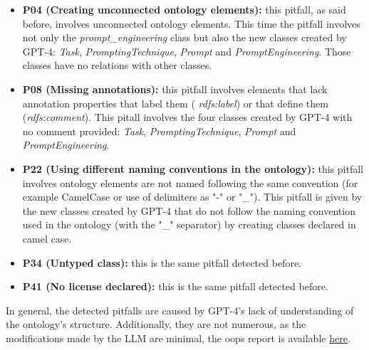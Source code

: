 \begin{itemize}
    \item \textbf{P04 (Creating unconnected ontology elements):} this pitfall, as said before, involves unconnected ontology elements. This time the pitfall involves not only the \textit{prompt\_engineering} class but also the new classes created by GPT-4: \textit{Task}, \textit{PromptingTechnique}, \textit{Prompt} and \textit{PromptEngineering}. Those classes have no relations with other classes.

    \item \textbf{P08 (Missing annotations):} this pitfall involves elements that lack annotation properties that label them ( \textit{rdfs:label}) or that define them\\ (\textit{rdfs:comment}). This pitall involves the four classes created by GPT-4 with no comment provided: \textit{Task}, \textit{PromptingTechnique}, \textit{Prompt} and \textit{PromptEngineering}.  

    \item \textbf{P22 (Using different naming conventions in the ontology):} this pitfall involves ontology elements are not named following the same convention (for example CamelCase or use of delimiters as "-" or "\_"). This pitfall is given by the new classes created by GPT-4 that do not follow the naming convention used in the ontology (with the "\_" separator) by creating classes declared in camel case.

    \item \textbf{P34 (Untyped class):} this is the same pitfall detected before.

    \item \textbf{P41 (No license declared):} this is the same pitfall detected before.
\end{itemize}
In general, the detected pitfalls are caused by GPT-4's lack of understanding of the ontology's structure. Additionally, they are not numerous, as the modifications made by the LLM are minimal, the oops report is available \href{https://github.com/simonegramegna/peo/blob/main/evaluation/oops_report_peo_gpt4.xml}{here}.


